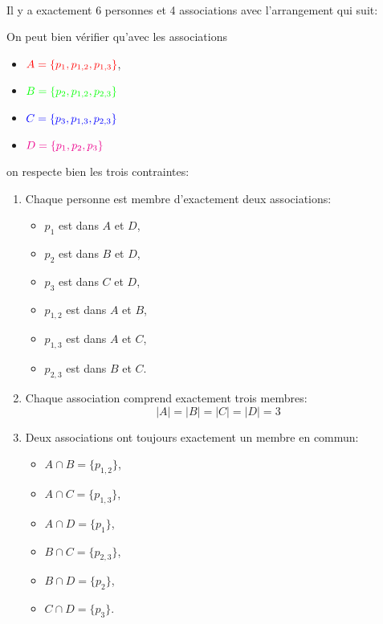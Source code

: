 \begin{td-sol}[]\,\\ %
    Il y a exactement 6 personnes et 4 associations avec l'arrangement qui suit:

    \vspace{0.5cm}
    

    On peut bien vérifier qu'avec les associations
    \begin{itemize}
        \item \(\color{red}A = \{p_1, p_{1,2}, p_{1,3}\}\),
        \item \(\color{green}B = \{p_2, p_{1,2}, p_{2,3}\}\)
        \item \(\color{blue}C = \{p_3, p_{1,3}, p_{2,3}\}\)
        \item \(\color{magenta}D = \{p_1, p_2, p_3\}\)
    \end{itemize}
    on respecte bien les trois contraintes:
    \begin{enumerate}
        \item Chaque personne est membre d'exactement deux associations:
        \begin{itemize}
            \item \(p_1\) est dans \(A\) et \(D\),
            \item \(p_2\) est dans \(B\) et \(D\),
            \item \(p_3\) est dans \(C\) et \(D\),
            \item \(p_{1,2}\) est dans \(A\) et \(B\),
            \item \(p_{1,3}\) est dans \(A\) et \(C\),
            \item \(p_{2,3}\) est dans \(B\) et \(C\).
        \end{itemize}
        \item Chaque association comprend exactement trois membres: 
        \begin{equation*}
            |A| = |B| = |C| = |D| = 3
        \end{equation*}
        \item Deux associations ont toujours exactement un membre en commun:
        \begin{itemize}
            \item \(A\cap B = \{p_{1,2}\}\),
            \item \(A\cap C = \{p_{1,3}\}\),
            \item \(A\cap D = \{p_1\}\),
            \item \(B\cap C = \{p_{2,3}\}\),
            \item \(B\cap D = \{p_2\}\),
            \item \(C\cap D = \{p_3\}\).
        \end{itemize}
    \end{enumerate}
\end{td-sol}

